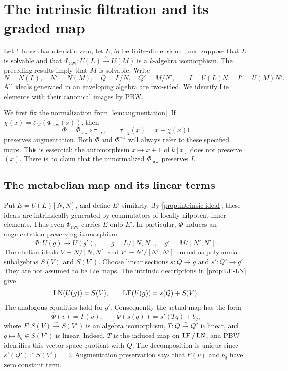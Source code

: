 \section{The intrinsic filtration and its graded map}\label{sec:filtration}

Let \(k\) have characteristic zero, let \(L,M\) be finite-dimensional,
and suppose that \(L\) is solvable and that
\(\Phi_{\mathrm{raw}}:U(L)\xrightarrow{\sim}U(M)\) is a \(k\)-algebra isomorphism.
The preceding results imply that \(M\) is solvable. Write
\[
 N=N(L),\quad N'=N(M),\quad
 Q=L/N,\quad Q'=M/N',
 \qquad I=U(L)N,\quad I'=U(M)N'.
\]
All ideals generated in an enveloping algebra are two-sided. We identify
Lie elements with their canonical images by PBW.

We first fix the normalization from \cref{lem:augmentation}. If
\(\chi(x)=\varepsilon_M(\Phi_{\mathrm{raw}}(x))\), then
\[
 \Phi=\Phi_{\mathrm{raw}}\circ\tau_{-\chi},\qquad
 \tau_{-\chi}(x)=x-\chi(x)1
\]
preserves augmentation. Both \(\Phi\) and \(\Phi^{-1}\) will always refer
to these specified maps. This is essential: the automorphism
\(x\mapsto x+1\) of \(k[x]\) does not preserve \((x)\).
There is no claim that the unnormalized \(\Phi_{\mathrm{raw}}\) preserves \(I\).

\subsection{The metabelian map and its linear terms}

Put \(E=U(L)[N,N]\), and define \(E'\) similarly.
By \cref{prop:intrinsic-ideal}, these ideals are intrinsically generated
by commutators of locally nilpotent inner elements. Thus even
\(\Phi_{\mathrm{raw}}\) carries \(E\) onto \(E'\). In particular, \(\Phi\) induces
an augmentation-preserving isomorphism
\[
 \overline\Phi:U(g)\xrightarrow{\sim}U(g'),
 \qquad g=L/[N,N],\quad
 g'=M/[N',N'].
\]
The abelian ideals \(V=N/[N,N]\) and \(V'=N'/[N',N']\)
embed as polynomial subalgebras \(S(V)\) and \(S(V')\).
Choose linear sections \(s:Q\to g\) and
\(s':Q'\to g'\). They are not assumed to be Lie maps.
The intrinsic descriptions in \cref{prop:LF-LN} give
\[
 \operatorname{LN}(U(g))=S(V),\qquad
 \operatorname{LF}(U(g))=s(Q)+S(V).
\]
The analogous equalities hold for \(g'\).
Consequently the actual map has the form
\begin{equation}\label{eq:metabelian-map}
 \overline\Phi(v)=F(v),\qquad
 \overline\Phi(s(q))=s'(Tq)+b_q,
\end{equation}
where \(F:S(V)\xrightarrow{\sim}S(V')\) is an algebra isomorphism,
\(T:Q\xrightarrow{\sim}Q'\) is linear, and \(q\mapsto b_q\in S(V')\)
is linear. Indeed, \(T\) is the induced map on
\(\operatorname{LF}/\operatorname{LN}\), and PBW identifies this vector-space quotient with \(Q\).
The decomposition is unique since \(s'(Q')\cap S(V')=0\).
Augmentation preservation says that \(F(v)\) and \(b_q\) have zero
constant term.

